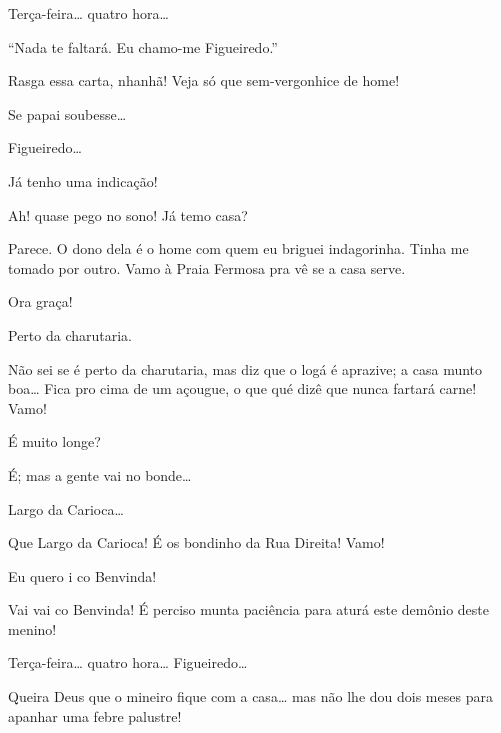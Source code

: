   Terça-feira\ldots{} quatro hora\ldots{}

 “Nada te faltará. Eu chamo-me Figueiredo.”

 Rasga essa carta, nhanhã! Veja só que sem-vergonhice de home!

  Se papai soubesse\ldots{}

  Figueiredo\ldots{}


 Já tenho uma indicação!

  Ah! quase pego no sono!  Já
temo casa?

 Parece. O dono dela é o home com quem eu briguei indagorinha.
Tinha me tomado por outro. Vamo à Praia Fermosa pra vê se a casa serve.

 Ora graça!

  Perto da charutaria.

  Não sei se é perto da charutaria, mas diz que o logá
é aprazive; a casa munto boa\ldots{} Fica pro cima de um açougue, o que qué dizê
que nunca fartará carne! Vamo!

 É muito longe?

 É; mas a gente vai no bonde\ldots{}

  Largo da Carioca\ldots{}

  Que Largo da Carioca! É os bondinho da Rua Direita!
Vamo!

 Eu quero i co Benvinda!

 Vai vai co Benvinda! É perciso munta paciência para aturá este
demônio deste menino! 

  Terça-feira\ldots{}
quatro hora\ldots{} Figueiredo\ldots{}


  Queira Deus que o mineiro fique com a
casa\ldots{} mas não lhe dou dois meses para apanhar uma febre palustre! 


